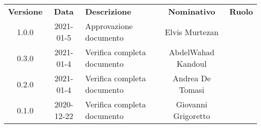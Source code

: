 {
    \renewcommand{\arraystretch}{1.5}
    \centering
    \begin{longtable}{ c c  C{4cm}  c  c }
        \rowcolor{\primaryColor}
        \textcolor{\secondaryColor}{
        \textbf{Versione}}     & \textcolor{\secondaryColor}{\textbf{Data}}       & \textcolor{\secondaryColor}
        {\textbf{Descrizione}} & \textcolor{\secondaryColor}{\textbf{Nominativo}} & \textcolor{\secondaryColor}{\textbf{Ruolo}}                          \\


        1.0.0                  & 2021-01-5                                      & Approvazione documento         & Elvis Murtezan & \responsabile{} \\
        
        0.3.0                  & 2021-01-4                                       & Verifica completa documento    & AbdelWahad Kandoul & \verificatore{} \\
        
        0.2.0                  & 2021-01-4                                       & Verifica completa documento   & Andrea De Tomasi & \verificatore{}    \\
        
        0.1.0                  & 2020-12-22                                       & Verifica completa documento        & Giovanni Grigoretto & \verificatore{}    \\
    \end{longtable}
}
